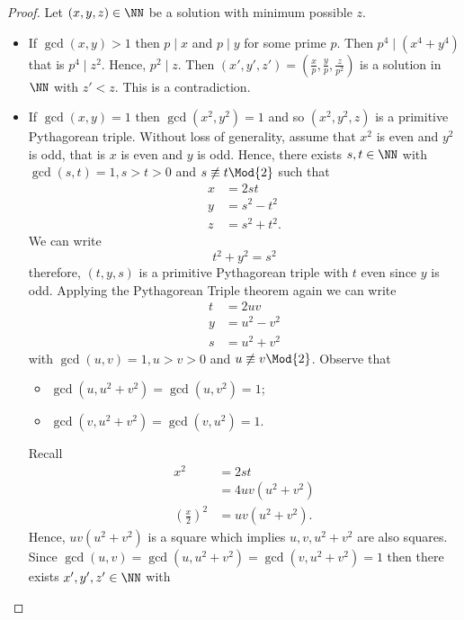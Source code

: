 \documentclass[12pt, a4paper]{article}
\begin{document}
\begin{proof}
    Let \((x,y,z) \in \NN\) be a solution with minimum possible \(z\). 
    \begin{itemize}
        \item If \(\gcd(x,y) >1\) then \(p \mid x\) and \(p \mid y\) for some prime \(p\). Then \(p^4 \mid (x^4+y^4)\) that is \(p^4 \mid z^2\). Hence, \(p^2 \mid z\). Then \((x',y',z')=\left( \frac{x}{p} ,\frac{y}{p},\frac{z}{p^2} \right)\) is a solution in \(\NN\) with \(z'<z\). This is a contradiction.
        \item If \(\gcd(x,y)=1\) then \(\gcd(x^2,y^2)=1\) and so \((x^2,y^2,z)\) is a primitive Pythagorean triple. Without loss of generality, assume that \(x^2\) is even and \(y^2\) is odd, that is \(x\) is even and \(y\) is odd. Hence, there exists \(s,t \in \NN\) with \(\gcd(s,t)=1, s>t>0\) and \(s \not\equiv t \Mod{2}\) such that 
        \[\begin{aligned}
            x&=2st \\
            y&=s^2-t^2 \\
            z&=s^2+t^2.
        \end{aligned}\]
        We can write
        \[t^2+y^2=s^2\]
        therefore, \((t,y,s)\) is a primitive Pythagorean triple with \(t\) even since \(y\) is odd. Applying the Pythagorean Triple theorem again we can write 
        \[\begin{aligned}
            t &= 2uv \\
            y&=u^2-v^2 \\
            s&=u^2+v^2 
        \end{aligned}\]
        with \(\gcd(u,v)=1, u>v>0\) and \(u \not\equiv v \Mod{2}\). Observe that 
        \begin{itemize}
            \item \(\gcd(u,u^2+v^2)=\gcd(u,v^2)=1\);
            \item \(\gcd(v,u^2+v^2)=\gcd(v,u^2)=1\).
        \end{itemize}
        Recall
        \[\begin{aligned}
            x^2 &=2st \\
                &=4uv(u^2+v^2) \\
            \left( \frac{x}{2} \right)^2  &= uv(u^2+v^2).
        \end{aligned}\]
        Hence, \(uv(u^2+v^2)\) is a square which implies \(u,v, u^2+v^2\) are also squares. Since \(\gcd(u,v)=\gcd(u,u^2+v^2)=\gcd(v,u^2+v^2)=1\) then there exists \(x',y',z' \in \NN\) with 

\end{itemize}
\end{proof}
\end{document}
